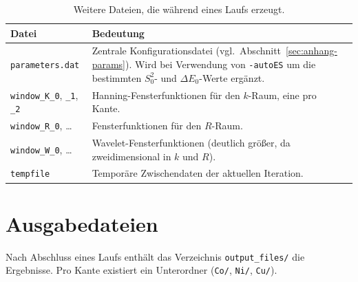 \begin{table}[htbp]
  \centering
  \caption{Weitere Dateien, die \evax{} während eines Laufs erzeugt.}
  \label{tab:evax-dateien}
  \small
  \begin{tabularx}{\textwidth}{lX}
    \toprule
    \textbf{Datei} & \textbf{Bedeutung} \\
    \midrule
    \texttt{parameters.dat} &
      Zentrale Konfigurationsdatei (vgl.\
      Abschnitt~\ref{sec:anhang-params}).
      Wird bei Verwendung von \texttt{-autoES} um die bestimmten
      $S_0^2$- und $\Delta E_0$-Werte ergänzt. \\
    \texttt{window\_K\_0}, \texttt{\_1}, \texttt{\_2} &
      Hanning-Fensterfunktionen für den $k$-Raum, eine pro Kante. \\
    \texttt{window\_R\_0}, \ldots &
      Fensterfunktionen für den $R$-Raum. \\
    \texttt{window\_W\_0}, \ldots &
      Wavelet-Fensterfunktionen (deutlich größer, da
      zweidimensional in $k$ und $R$). \\
    \texttt{tempfile} &
      Temporäre Zwischendaten der aktuellen Iteration. \\
    \bottomrule
  \end{tabularx}
\end{table}


\section{Ausgabedateien}
\label{sec:anhang-output}

Nach Abschluss eines Laufs enthält das Verzeichnis
\texttt{output\_files/} die Ergebnisse.
Pro Kante existiert ein Unterordner
(\texttt{Co/}, \texttt{Ni/}, \texttt{Cu/}).

